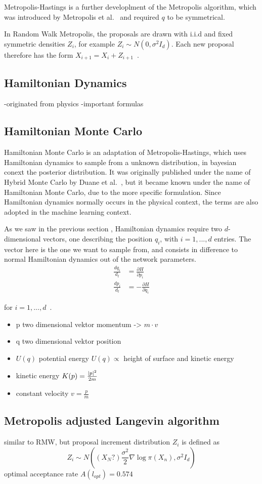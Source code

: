 Metropolis-Hastings is a further developlment of the Metropolis algorithm, which was introduced by Metropolis et al.~\cite{metropolis1953} and required $q$ to be symmetrical.

In Random Walk Metropolis, the proposals are drawn with i.i.d and fixed symmetric densities $Z_i$,
for example $Z_i\sim N(0,\sigma^2 I_d)$.
Each new proposal therefore has the form $X_{i+1} = X_i + Z_{i+1}$~\cite{rosenthal2011optimal}.
\subsection{Hamiltonian Dynamics}
-originated from physics
-important formulas
\subsection{Hamiltonian Monte Carlo}
Hamiltonian Monte Carlo is an adaptation of Metropolis-Hastings, which uses 
Hamiltonian dynamics to sample from a unknown distribution, in bayesian conext the posterior distribution.
It was originally published under the name of Hybrid Monte Carlo by Duane et al.~\cite{DUANE1987216}, but 
it became known under the name of Hamiltonian Monte Carlo, due to the more specific formulation.
Since Hamiltonian dynamics normally occurs in the physical context, the terms are also adopted in the machine learning context.

As we saw in the previous section , Hamiltonian dynamics require two $d$-dimensional vectors, one describing the position $q_i$, with $i=1,...,d$ entries. 
The vector here is the one we want to sample from, and consists in difference to normal Hamiltonian dynamics out of the network parameters. 
\begin{align*}
    \frac{dq_i}{d_t}&=\frac{\partial H}{\partial p_i} \\
    \frac{dp_i}{d_t}&=-\frac{\partial H}{\partial q_i}
\end{align*}

for $i=1,...,d$~\cite{MR2858447}. 


  

\begin{itemize}
    \item p two dimensional vektor momentum -> $m\cdot v$
    \item q two dimensional vektor position 
    \item $U(q)$ potential energy $U(q)\propto$ height of surface and kinetic energy
    \item kinetic energy $K(p)=\frac{\left\lvert p\right\rvert^2}{2m}$
    \item constant velocity $v=\frac{p}{m}$
\end{itemize}   
\subsection{Metropolis adjusted Langevin algorithm}
 
similar to RMW, but proposal increment distribution $Z_i$ is defined as 
\[
Z_i \sim N((X_N?)\frac{\sigma^2}{2}\nabla\log\pi(X_n),\sigma^2I_d)
\]
optimal acceptance rate $A(l_{opt})=0.574$


